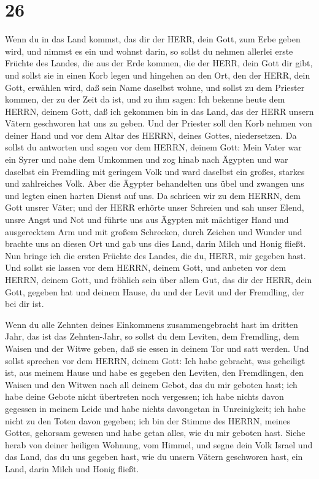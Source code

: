 \hypertarget{section-25}{%
\section{26}\label{section-25}}

 Wenn du in das Land kommst, das dir der HERR, dein Gott,
zum Erbe geben wird, und nimmst es ein und wohnst darin,  so
sollst du nehmen allerlei erste Früchte des Landes, die aus der Erde
kommen, die der HERR, dein Gott dir gibt, und sollst sie in einen Korb
legen und hingehen an den Ort, den der HERR, dein Gott, erwählen wird,
daß sein Name daselbst wohne,  und sollst zu dem Priester
kommen, der zu der Zeit da ist, und zu ihm sagen: Ich bekenne heute dem
HERRN, deinem Gott, daß ich gekommen bin in das Land, das der HERR
unsern Vätern geschworen hat uns zu geben.  Und der Priester
soll den Korb nehmen von deiner Hand und vor dem Altar des HERRN, deines
Gottes, niedersetzen.  Da sollst du antworten und sagen vor
dem HERRN, deinem Gott: Mein Vater war ein Syrer und nahe dem Umkommen
und zog hinab nach Ägypten und war daselbst ein Fremdling mit geringem
Volk und ward daselbst ein großes, starkes und zahlreiches Volk.
 Aber die Ägypter behandelten uns übel und zwangen uns und
legten einen harten Dienst auf uns.  Da schrieen wir zu dem
HERRN, dem Gott unsrer Väter; und der HERR erhörte unser Schreien und
sah unser Elend, unsre Angst und Not  und führte uns aus
Ägypten mit mächtiger Hand und ausgerecktem Arm und mit großem
Schrecken, durch Zeichen und Wunder  und brachte uns an
diesen Ort und gab uns dies Land, darin Milch und Honig fließt.
 Nun bringe ich die ersten Früchte des Landes, die du,
HERR, mir gegeben hast. Und sollst sie lassen vor dem HERRN, deinem
Gott, und anbeten vor dem HERRN, deinem Gott,  und fröhlich
sein über allem Gut, das dir der HERR, dein Gott, gegeben hat und deinem
Hause, du und der Levit und der Fremdling, der bei dir ist.

 Wenn du alle Zehnten deines Einkommens zusammengebracht
hast im dritten Jahr, das ist das Zehnten-Jahr, so sollst du dem
Leviten, dem Fremdling, dem Waisen und der Witwe geben, daß sie essen in
deinem Tor und satt werden.  Und sollst sprechen vor dem
HERRN, deinem Gott: Ich habe gebracht, was geheiligt ist, aus meinem
Hause und habe es gegeben den Leviten, den Fremdlingen, den Waisen und
den Witwen nach all deinem Gebot, das du mir geboten hast; ich habe
deine Gebote nicht übertreten noch vergessen;  ich habe
nichts davon gegessen in meinem Leide und habe nichts davongetan in
Unreinigkeit; ich habe nicht zu den Toten davon gegeben; ich bin der
Stimme des HERRN, meines Gottes, gehorsam gewesen und habe getan alles,
wie du mir geboten hast.  Siehe herab von deiner heiligen
Wohnung, vom Himmel, und segne dein Volk Israel und das Land, das du uns
gegeben hast, wie du unsern Vätern geschworen hast, ein Land, darin
Milch und Honig fließt.

